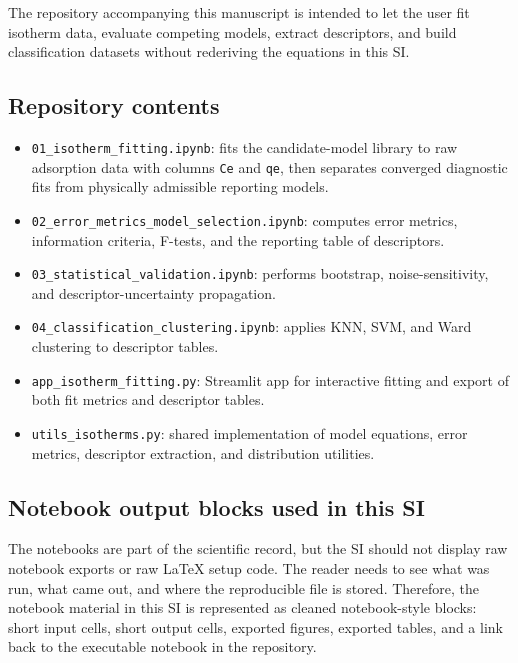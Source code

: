 \documentclass[journal=jacsat,manuscript=article]{achemso}
\begin{document}
The repository accompanying this manuscript is intended to let the user fit
isotherm data, evaluate competing models, extract descriptors, and build
classification datasets without rederiving the equations in this SI.

\subsection{Repository contents}
\label{sec:si_notebook_contents}

\begin{itemize}
	\item \texttt{01\_isotherm\_fitting.ipynb}: fits the candidate-model library to raw adsorption data with columns \texttt{Ce} and \texttt{qe}, then separates converged diagnostic fits from physically admissible reporting models.
	\item \texttt{02\_error\_metrics\_model\_selection.ipynb}: computes error
	metrics, information criteria, F-tests, and the reporting table of
	descriptors.
	\item \texttt{03\_statistical\_validation.ipynb}: performs bootstrap,
	noise-sensitivity, and descriptor-uncertainty propagation.
	\item \texttt{04\_classification\_clustering.ipynb}: applies KNN, SVM, and
	Ward clustering to descriptor tables.
	\item \texttt{app\_isotherm\_fitting.py}: Streamlit app for interactive fitting
	and export of both fit metrics and descriptor tables.
	\item \texttt{utils\_isotherms.py}: shared implementation of model equations,
	error metrics, descriptor extraction, and distribution utilities.
\end{itemize}

\subsection{Notebook output blocks used in this SI}
\label{sec:si_notebook_latex_export}

The notebooks are part of the scientific record, but the SI should not display
raw notebook exports or raw \LaTeX{} setup code. The reader needs to see what was
run, what came out, and where the reproducible file is stored. Therefore, the
notebook material in this SI is represented as cleaned notebook-style blocks:
short input cells, short output cells, exported figures, exported tables, and a
link back to the executable notebook in the repository.
\end{document}
